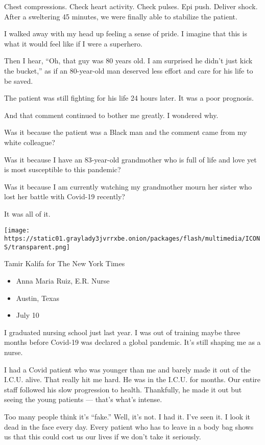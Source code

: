 Chest compressions. Check heart activity. Check pulses. Epi push.
Deliver shock. After a sweltering 45 minutes, we were finally able to
stabilize the patient.

I walked away with my head up feeling a sense of pride. I imagine that
this is what it would feel like if I were a superhero.

Then I hear, ``Oh, that guy was 80 years old. I am surprised he didn't
just kick the bucket,'' as if an 80-year-old man deserved less effort
and care for his life to be saved.

The patient was still fighting for his life 24 hours later. It was a
poor prognosis.

And that comment continued to bother me greatly. I wondered why.

Was it because the patient was a Black man and the comment came from my
white colleague?

Was it because I have an 83-year-old grandmother who is full of life and
love yet is most susceptible to this pandemic?

Was it because I am currently watching my grandmother mourn her sister
who lost her battle with Covid-19 recently?

It was all of it.

\texttt{[image: https://static01.graylady3jvrrxbe.onion/packages/flash/multimedia/ICONS/transparent.png]}

Tamir Kalifa for The New York Times

\begin{itemize}
\tightlist
\item
  Anna Maria Ruiz, E.R. Nurse
\item
  Austin, Texas
\item
  July 10
\end{itemize}

I graduated nursing school just last year. I was out of training maybe
three months before Covid-19 was declared a global pandemic. It's still
shaping me as a nurse.

I had a Covid patient who was younger than me and barely made it out of
the I.C.U. alive. That really hit me hard. He was in the I.C.U. for
months. Our entire staff followed his slow progression to health.
Thankfully, he made it out but seeing the young patients --- that's
what's intense.

Too many people think it's ``fake.'' Well, it's not. I had it. I've seen
it. I look it dead in the face every day. Every patient who has to leave
in a body bag shows us that this could cost us our lives if we don't
take it seriously.

